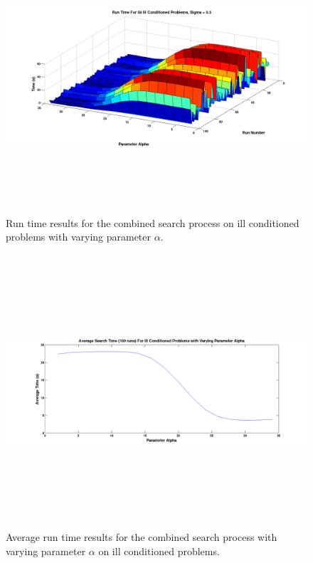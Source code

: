 \documentclass[12pt,Bold,letterpaper]{mcgilletdclass}
\begin{document}
\begin{figure}
\centering
\includegraphics[width=6.5in,height=4in]{illConditionedSearch.png}
\caption{Run time results for the combined search process on ill conditioned problems with varying parameter $\alpha$.}
\label{fig:illConditionedSearch}
\end{figure}

\begin{figure}
\centering
\includegraphics[width=6.5in,height=4in]{averageSearchTimesIll.png}
\caption{Average run time results for the combined search process with varying parameter $\alpha$ on ill conditioned problems.}
\label{fig:searchAverageIll}
\end{figure}
\end{document}
